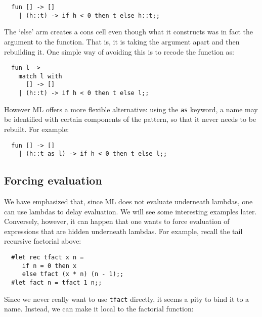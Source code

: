 \begin{boxed}\begin{lstlisting}
  fun [] -> []
    | (h::t) -> if h < 0 then t else h::t;;
\end{lstlisting}\end{boxed}

The `else' arm creates a cons cell even though what it constructs was in fact
the argument to the function. That is, it is taking the argument apart and then
rebuilding it. One simple way of avoiding this is to recode the function as:

\begin{boxed}\begin{lstlisting}
  fun l ->
    match l with
      [] -> []
    | (h::t) -> if h < 0 then t else l;;
\end{lstlisting}\end{boxed}

However ML offers a more flexible alternative: using the {\tt as} keyword, a
name may be identified with certain components of the pattern, so that it never
needs to be rebuilt. For example:

\begin{boxed}\begin{lstlisting}
  fun [] -> []
    | (h::t as l) -> if h < 0 then t else l;;
\end{lstlisting}\end{boxed}

\subsection{Forcing evaluation}

We have emphasized that, since ML does not evaluate underneath lambdas, one can
use lambdas to delay evaluation. We will see some interesting examples later.
Conversely, however, it can happen that one wants to force evaluation of
expressions that are hidden underneath lambdas. For example, recall the tail
recursive factorial above:

\begin{boxed}\begin{verbatim}
  #let rec tfact x n =
     if n = 0 then x
     else tfact (x * n) (n - 1);;
  #let fact n = tfact 1 n;;
\end{verbatim}\end{boxed}

Since we never really want to use {\tt tfact} directly, it seems a pity to bind
it to a name. Instead, we can make it local to the factorial function:

